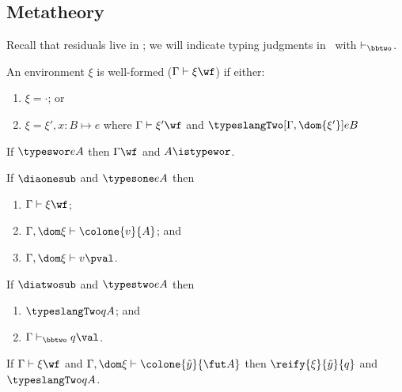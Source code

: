 \subsection{Metatheory}

Recall that residuals live in \langTwo; we will indicate typing judgments in
\langTwo\ with $\vdash_\bbtwo$.


\begin{definition}
An environment $\xi$ is well-formed ($\Gamma\vdash\xi\wf$) if either:
\begin{enumerate}
\item $\xi = \cdot$; or
\item $\xi = \xi',x:B\mapsto e$ where
$\Gamma\vdash\xi'\wf$ and
$\typeslangTwo[\Gamma,\dom{\xi'}] e B$
\end{enumerate}
\end{definition}

\begin{theorem}
If $\typeswor e A$ then $\Gamma\wf$ and $A\istypewor$.
\end{theorem}

\begin{theorem}
If $\diaonesub$ and $\typesone e A$ then
\begin{enumerate}
\item $\Gamma\vdash\xi\wf$;
\item $\Gamma,\dom\xi\vdash \colone{v}{A}$; and
\item $\Gamma,\dom\xi\vdash v\pval$.
\end{enumerate}
\end{theorem}

\begin{theorem}
If $\diatwosub$ and $\typestwo e A$ then
\begin{enumerate}
\item $\typeslangTwo q A$; and
\item $\Gamma\vdash_\bbtwo q\val$.
\end{enumerate}
\end{theorem}

\begin{theorem}\label{thm:reify-type}
If $\Gamma\vdash\xi\wf$ and
$\Gamma,\dom\xi\vdash \colone{\next\ \hat y}{\fut A}$
then 
$\reify{\xi}{\hat y}{q}$ and
$\typeslangTwo q A$.
\end{theorem}

